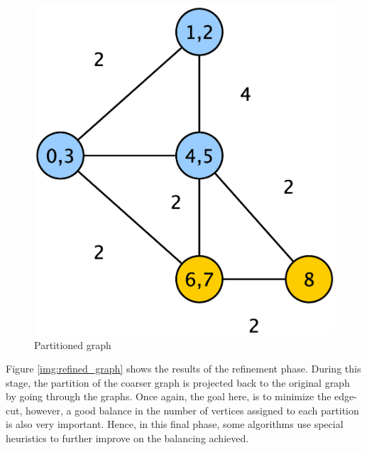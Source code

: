\documentclass[abstract=on,9pt,twocolumn]{scrartcl}
\begin{document}
\begin{center}
  \begin{figure}[htb]
    \includegraphics[width=\columnwidth]{img/partition.eps}
    \caption{Partitioned graph}
    \label{img:part_graph}
  \end{figure}
\end{center}

Figure \ref{img:refined_graph} shows the results of the refinement phase. During this stage, the partition of the coarser graph is projected back to the original graph by going through the graphs.\cite{Karypis:1998:FHQ:305219.305248}
Once again, the goal here, is to minimize the edge-cut, however, a good balance in the number of vertices assigned to each partition is also very important. Hence, in this final phase, some algorithms use special heuristics to further improve on the balancing achieved.
\end{document}
